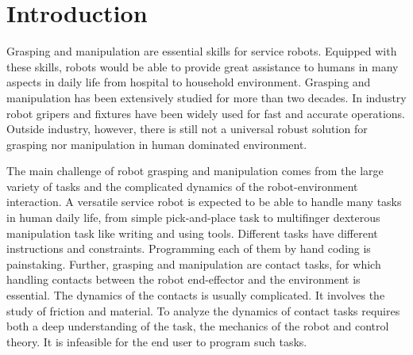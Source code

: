 \chapter{Introduction}
\label{cha1}

\setcounter{page}{1}
Grasping and manipulation are essential skills for service robots. Equipped with these skills, robots would be able to provide great assistance to humans in many aspects in daily life from hospital to household environment. Grasping and manipulation has been extensively studied for more than two decades. In industry robot gripers and fixtures have been widely used for fast and accurate operations. Outside industry, however, there is still not a universal robust solution for grasping nor manipulation in human dominated environment.


The main challenge of robot grasping and manipulation comes from the large variety of tasks and the complicated dynamics of the robot-environment interaction. A versatile service robot is expected to be able to handle many tasks in human daily life, from simple pick-and-place task to multifinger dexterous manipulation task like writing and using tools. Different tasks have different instructions and constraints. Programming each of them by hand coding is painstaking. Further, grasping and manipulation are contact tasks, for which handling contacts between the robot end-effector and the environment is essential. The dynamics of the contacts is usually complicated. It involves the study of friction and material. To analyze the dynamics of contact tasks requires both a deep understanding of the task, the mechanics of the robot and control theory. It is infeasible for the end user to program such tasks.

